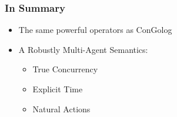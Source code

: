 \documentclass[compress]{beamer}
\begin{document}
\begin{frame}
\frametitle{In Summary}
\begin{itemize}
\item The same powerful operators as ConGolog
\item A Robustly Multi-Agent Semantics:
\begin{itemize}
\item True Concurrency
\item Explicit Time
\item Natural Actions
\end{itemize}
\end{itemize}
\end{frame}
\end{document}

